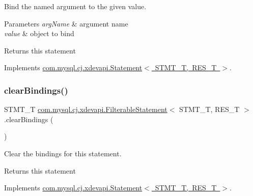 Bind the named argument to the given value.


\begin{DoxyParams}{Parameters}
{\em arg\+Name} & argument name \\
\hline
{\em value} & object to bind \\
\hline
\end{DoxyParams}
\begin{DoxyReturn}{Returns}
this statement 
\end{DoxyReturn}


Implements \mbox{\hyperlink{interfacecom_1_1mysql_1_1cj_1_1xdevapi_1_1_statement_ad4a21af767982f02e50d244b705ee24b}{com.\+mysql.\+cj.\+xdevapi.\+Statement$<$ S\+T\+M\+T\+\_\+\+T, R\+E\+S\+\_\+\+T $>$}}.

\mbox{\label{classcom_1_1mysql_1_1cj_1_1xdevapi_1_1_filterable_statement_a6f81659cd181c72dea83972c18438f56}} 
\subsubsection{\texorpdfstring{clear\+Bindings()}{clearBindings()}}
{\footnotesize\ttfamily S\+T\+M\+T\+\_\+T \mbox{\hyperlink{classcom_1_1mysql_1_1cj_1_1xdevapi_1_1_filterable_statement}{com.\+mysql.\+cj.\+xdevapi.\+Filterable\+Statement}}$<$ S\+T\+M\+T\+\_\+T, R\+E\+S\+\_\+T $>$.clear\+Bindings (\begin{DoxyParamCaption}{ }\end{DoxyParamCaption})}

Clear the bindings for this statement.

\begin{DoxyReturn}{Returns}
this statement 
\end{DoxyReturn}


Implements \mbox{\hyperlink{interfacecom_1_1mysql_1_1cj_1_1xdevapi_1_1_statement_a7be7ea383c05f9b1662b75eed8982ff1}{com.\+mysql.\+cj.\+xdevapi.\+Statement$<$ S\+T\+M\+T\+\_\+\+T, R\+E\+S\+\_\+\+T $>$}}.

\mbox{\label{classcom_1_1mysql_1_1cj_1_1xdevapi_1_1_filterable_statement_a0fc92f86e2ee374cbf5c7fe66d7c7dea}} 

